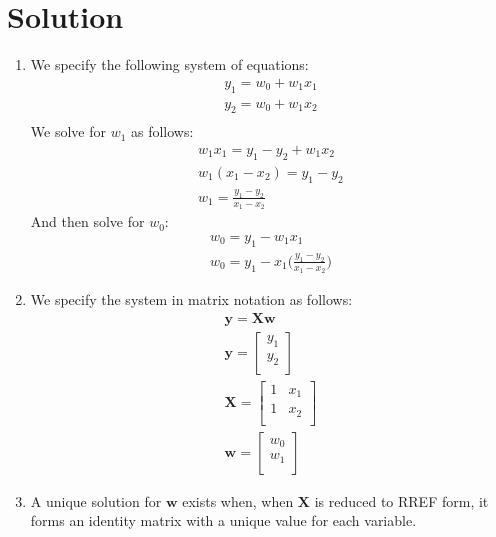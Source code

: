 \documentclass{harvardml}
\theoremstyle{definition}
\theoremstyle{plain}
\newenvironment{solution}
  {\color{blue}\section*{Solution}}
{}
\begin{document}
\begin{solution}
    \begin{enumerate}
        \item We specify the following system of equations:\\
        \begin{align*}
            y_1 = w_0 + w_1x_1\\
            y_2 = w_0 + w_1x_2\\
        \end{align*}
        We solve for $w_1$ as follows:\\
        \begin{align*}
            w_1x_1 = y_1 - y_2 + w_1x_2\\
            w_1(x_1 - x_2) = y_1 - y_2\\
            w_1 = \frac{y_1 - y_2}{x_1-x_2}
        \end{align*}
        And then solve for $w_0$:\\
        \begin{align*}
            w_0 = y_1 - w_1x_1\\
            w_0 = y_1 - x_1\Big(\frac{y_1 - y_2}{x_1-x_2}\Big)
        \end{align*}
        \item We specify the system in matrix notation as follows:
        \begin{align*}
            \mathbf{y} = \mathbf{X}\mathbf{w}\\
            \mathbf{y} = \begin{bmatrix}
                y_1 \\
                y_2 \\
            \end{bmatrix}\\
            \mathbf{X} = \begin{bmatrix}
                1 & x_1 \\
                1 & x_2 \\
            \end{bmatrix}\\
            \mathbf{w} = \begin{bmatrix}
                w_0 \\
                w_1 \\
            \end{bmatrix}
        \end{align*}
        \item A unique solution for $\mathbf{w}$ exists when, when $\mathbf{X}$ is reduced to RREF form, it forms an identity matrix with a unique value for each variable.\\

\end{enumerate}
\end{solution}
\end{document}
